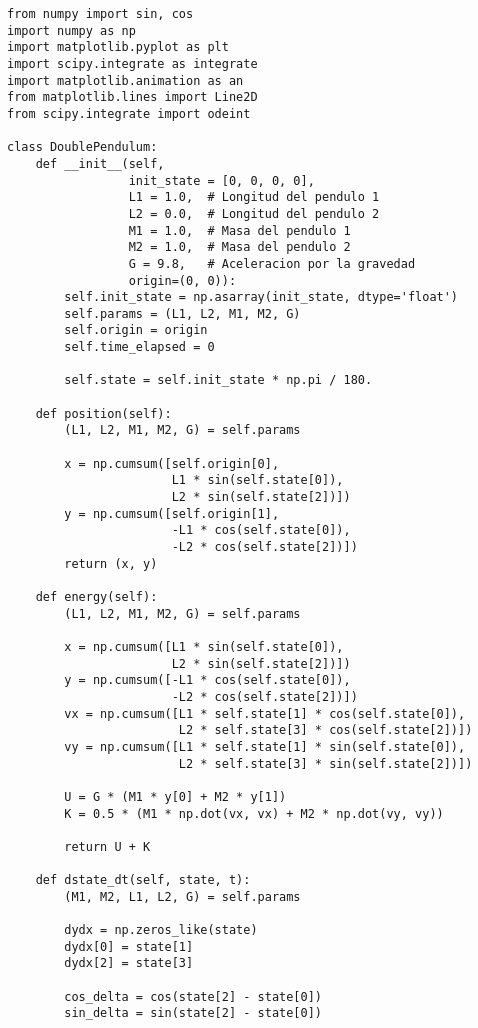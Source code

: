 \documentclass[a4paper]{article}
\begin{document}
\begin{verbatim}
from numpy import sin, cos
import numpy as np
import matplotlib.pyplot as plt
import scipy.integrate as integrate
import matplotlib.animation as an
from matplotlib.lines import Line2D
from scipy.integrate import odeint

class DoublePendulum:
    def __init__(self,
                 init_state = [0, 0, 0, 0],
                 L1 = 1.0,  # Longitud del pendulo 1
                 L2 = 0.0,  # Longitud del pendulo 2
                 M1 = 1.0,  # Masa del pendulo 1
                 M2 = 1.0,  # Masa del pendulo 2
                 G = 9.8,   # Aceleracion por la gravedad
                 origin=(0, 0)): 
        self.init_state = np.asarray(init_state, dtype='float')
        self.params = (L1, L2, M1, M2, G)
        self.origin = origin
        self.time_elapsed = 0

        self.state = self.init_state * np.pi / 180.
    
    def position(self):
        (L1, L2, M1, M2, G) = self.params

        x = np.cumsum([self.origin[0],
                       L1 * sin(self.state[0]),
                       L2 * sin(self.state[2])])
        y = np.cumsum([self.origin[1],
                       -L1 * cos(self.state[0]),
                       -L2 * cos(self.state[2])])
        return (x, y)

    def energy(self):
        (L1, L2, M1, M2, G) = self.params

        x = np.cumsum([L1 * sin(self.state[0]),
                       L2 * sin(self.state[2])])
        y = np.cumsum([-L1 * cos(self.state[0]),
                       -L2 * cos(self.state[2])])
        vx = np.cumsum([L1 * self.state[1] * cos(self.state[0]),
                        L2 * self.state[3] * cos(self.state[2])])
        vy = np.cumsum([L1 * self.state[1] * sin(self.state[0]),
                        L2 * self.state[3] * sin(self.state[2])])

        U = G * (M1 * y[0] + M2 * y[1])
        K = 0.5 * (M1 * np.dot(vx, vx) + M2 * np.dot(vy, vy))

        return U + K

    def dstate_dt(self, state, t):
        (M1, M2, L1, L2, G) = self.params

        dydx = np.zeros_like(state)
        dydx[0] = state[1]
        dydx[2] = state[3]

        cos_delta = cos(state[2] - state[0])
        sin_delta = sin(state[2] - state[0])


\end{verbatim}
\end{document}
